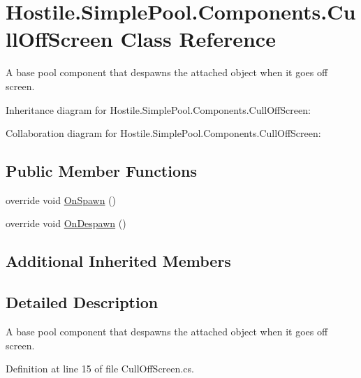 \hypertarget{class_hostile_1_1_simple_pool_1_1_components_1_1_cull_off_screen}{\section{Hostile.\-Simple\-Pool.\-Components.\-Cull\-Off\-Screen Class Reference}
\label{class_hostile_1_1_simple_pool_1_1_components_1_1_cull_off_screen}
}


A base pool component that despawns the attached object when it goes off screen.  




Inheritance diagram for Hostile.\-Simple\-Pool.\-Components.\-Cull\-Off\-Screen\-:


Collaboration diagram for Hostile.\-Simple\-Pool.\-Components.\-Cull\-Off\-Screen\-:
\subsection*{Public Member Functions}
\begin{DoxyCompactItemize}
\item 
override void \hyperlink{class_hostile_1_1_simple_pool_1_1_components_1_1_cull_off_screen_a6f8f2a33c8f0d28f109de1deb85dc2c5}{On\-Spawn} ()
\item 
override void \hyperlink{class_hostile_1_1_simple_pool_1_1_components_1_1_cull_off_screen_af502d099662c8c5a83318a78d4bdc1eb}{On\-Despawn} ()
\end{DoxyCompactItemize}
\subsection*{Additional Inherited Members}


\subsection{Detailed Description}
A base pool component that despawns the attached object when it goes off screen. 

Definition at line 15 of file Cull\-Off\-Screen.\-cs.



